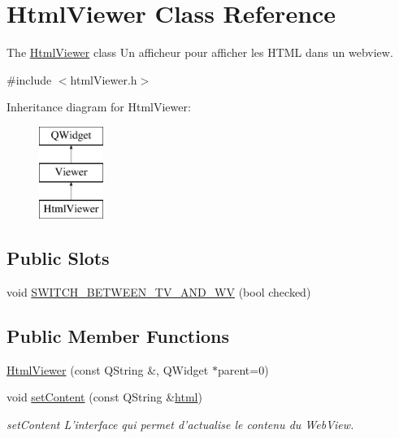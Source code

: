 \hypertarget{class_html_viewer}{\section{Html\-Viewer Class Reference}
\label{class_html_viewer}
}


The \hyperlink{class_html_viewer}{Html\-Viewer} class Un afficheur pour afficher les H\-T\-M\-L dans un webview.  




{\ttfamily \#include $<$html\-Viewer.\-h$>$}

Inheritance diagram for Html\-Viewer\-:\begin{figure}[H]
\begin{center}
\leavevmode
\includegraphics[height=3.000000cm]{class_html_viewer}
\end{center}
\end{figure}
\subsection*{Public Slots}
\begin{DoxyCompactItemize}
\item 
void \hyperlink{class_html_viewer_a1397d877ff4d7e04bed9835b6a18c6b8}{S\-W\-I\-T\-C\-H\-\_\-\-B\-E\-T\-W\-E\-E\-N\-\_\-\-T\-V\-\_\-\-A\-N\-D\-\_\-\-W\-V} (bool checked)
\end{DoxyCompactItemize}
\subsection*{Public Member Functions}
\begin{DoxyCompactItemize}
\item 
\hyperlink{class_html_viewer_aebfac05384babf523565411521faf11a}{Html\-Viewer} (const Q\-String \&, Q\-Widget $\ast$parent=0)
\item 
void \hyperlink{class_html_viewer_a35281d3600dd8d7874202c195aa0a5b2}{set\-Content} (const Q\-String \&\hyperlink{_export_strategy_8h_a6bd23bde1932319c9832c0129a94b307adaa398e933478cb16c49c46516e5f4c1}{html})
\begin{DoxyCompactList}\small\item\em set\-Content L'interface qui permet d'actualise le contenu du Web\-View. \end{DoxyCompactList}\end{DoxyCompactItemize}


